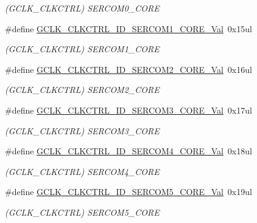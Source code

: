 \begin{DoxyCompactItemize}
\begin{DoxyCompactList}\small\item\em (G\+C\+L\+K\+\_\+\+C\+L\+K\+C\+T\+RL) S\+E\+R\+C\+O\+M0\+\_\+\+C\+O\+RE \end{DoxyCompactList}\item 
\#define \mbox{\hyperlink{group___s_a_m_d21___g_c_l_k_ga687c5b5b6f9d24d699c20826dae07ea1}{G\+C\+L\+K\+\_\+\+C\+L\+K\+C\+T\+R\+L\+\_\+\+I\+D\+\_\+\+S\+E\+R\+C\+O\+M1\+\_\+\+C\+O\+R\+E\+\_\+\+Val}}~0x15ul
\begin{DoxyCompactList}\small\item\em (G\+C\+L\+K\+\_\+\+C\+L\+K\+C\+T\+RL) S\+E\+R\+C\+O\+M1\+\_\+\+C\+O\+RE \end{DoxyCompactList}\item 
\#define \mbox{\hyperlink{group___s_a_m_d21___g_c_l_k_ga6c190884b0ecb6df1e282e9f52fc9625}{G\+C\+L\+K\+\_\+\+C\+L\+K\+C\+T\+R\+L\+\_\+\+I\+D\+\_\+\+S\+E\+R\+C\+O\+M2\+\_\+\+C\+O\+R\+E\+\_\+\+Val}}~0x16ul
\begin{DoxyCompactList}\small\item\em (G\+C\+L\+K\+\_\+\+C\+L\+K\+C\+T\+RL) S\+E\+R\+C\+O\+M2\+\_\+\+C\+O\+RE \end{DoxyCompactList}\item 
\#define \mbox{\hyperlink{group___s_a_m_d21___g_c_l_k_gafd61fc115b2df35b8362117d56e585f8}{G\+C\+L\+K\+\_\+\+C\+L\+K\+C\+T\+R\+L\+\_\+\+I\+D\+\_\+\+S\+E\+R\+C\+O\+M3\+\_\+\+C\+O\+R\+E\+\_\+\+Val}}~0x17ul
\begin{DoxyCompactList}\small\item\em (G\+C\+L\+K\+\_\+\+C\+L\+K\+C\+T\+RL) S\+E\+R\+C\+O\+M3\+\_\+\+C\+O\+RE \end{DoxyCompactList}\item 
\#define \mbox{\hyperlink{group___s_a_m_d21___g_c_l_k_ga6abe19ed53416097da5b95e3dca3d98d}{G\+C\+L\+K\+\_\+\+C\+L\+K\+C\+T\+R\+L\+\_\+\+I\+D\+\_\+\+S\+E\+R\+C\+O\+M4\+\_\+\+C\+O\+R\+E\+\_\+\+Val}}~0x18ul
\begin{DoxyCompactList}\small\item\em (G\+C\+L\+K\+\_\+\+C\+L\+K\+C\+T\+RL) S\+E\+R\+C\+O\+M4\+\_\+\+C\+O\+RE \end{DoxyCompactList}\item 
\#define \mbox{\hyperlink{group___s_a_m_d21___g_c_l_k_gadf32722a43710ff062d0581131ed71df}{G\+C\+L\+K\+\_\+\+C\+L\+K\+C\+T\+R\+L\+\_\+\+I\+D\+\_\+\+S\+E\+R\+C\+O\+M5\+\_\+\+C\+O\+R\+E\+\_\+\+Val}}~0x19ul
\begin{DoxyCompactList}\small\item\em (G\+C\+L\+K\+\_\+\+C\+L\+K\+C\+T\+RL) S\+E\+R\+C\+O\+M5\+\_\+\+C\+O\+RE \end{DoxyCompactList}\item 

\end{DoxyCompactItemize}
